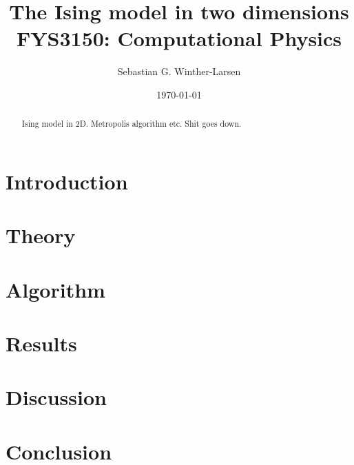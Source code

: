 \documentclass[10pt,a4paper]{amsart}
\title[Ising model in 2d]{The Ising model in two dimensions \\ 
	\hrulefill\small{ FYS3150: Computational Physics }\hrulefill}
\author[Winther-Larsen]{Sebastian G. Winther-Larsen}
\date{\today}
\begin{document}
\begin{titlepage}
\begin{abstract}
Ising model in 2D. Metropolis algorithm etc. Shit goes down.
\end{abstract}
\maketitle
\tableofcontents
\end{titlepage}

\section{Introduction}

\section{Theory}

\section{Algorithm}

\section{Results}

\section{Discussion}

\section{Conclusion}
\end{document}
